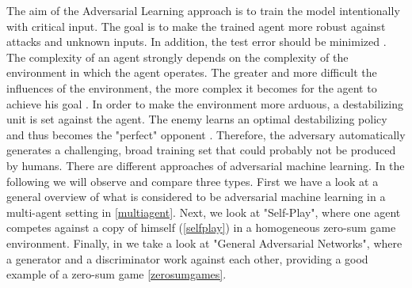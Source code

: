 The aim of the Adversarial Learning approach is to train the model intentionally with critical input. The goal is to make the trained agent more robust against attacks and unknown inputs. In addition, the test error should be minimized \cite{MachineLearningAtScale}.
The complexity of an agent strongly depends on the complexity of the environment in which the agent operates. The greater and more difficult the influences of the environment, the more complex it becomes for the agent to achieve his goal \cite{environmentBansal2017Oct}.
In order to make the environment more arduous, a destabilizing unit is set against the agent. The enemy learns an optimal destabilizing policy and thus becomes the "perfect" opponent \cite{robustPinto2017Mar}. Therefore, the adversary automatically generates a challenging, broad training set that could probably not be produced by humans.
There are different approaches of adversarial machine learning. In the following we will observe and compare three types. First we have a look at a general overview of what is considered to be adversarial machine learning in a multi-agent setting in \ref{multiagent}. Next, we look at "Self-Play", where one agent competes against a copy of himself (\ref{selfplay}) in a homogeneous zero-sum game environment. Finally, in \label{gans} we take a look at "General Adversarial Networks", where a generator and a discriminator work against each other, providing a good example of a zero-sum game \ref{zerosumgames}.